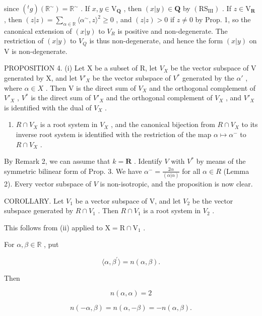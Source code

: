 since \((^t g)(\mathbb{R}^\sim) = \mathbb{R}^\sim\) . If \(x, y \in \mathrm{V}_{\mathbf{Q}}\) , then \((x|y) \in \mathbf{Q}\) by \((\mathrm{RS}_{\mathrm{III}})\) . If \(z \in \mathrm{V}_{\mathbf{R}}\) , then \((z|z) = \sum_{\alpha \in \mathbb{R}} \langle \alpha^\sim, z \rangle^2 \geqslant 0\) , and \((z|z) > 0\) if \(z \neq 0\) by Prop. 1, so the canonical extension of \((x|y)\) to \(V_{R}\) is positive and non-degenerate. The restriction of \((x|y)\) to \(V_{Q}\) is thus non-degenerate, and hence the form \((x|y)\) on V is non-degenerate.

PROPOSITION 4. (i) Let X be a subset of R, let \(V_{X}\) be the vector subspace of V generated by X, and let \(V'_{X}\) be the vector subspace of \(V^{*}\) generated by the \(\alpha'\) , where \(\alpha \in X\) . Then V is the direct sum of \(V_{X}\) and the orthogonal complement of \(V'_{X}\) , \(V^{*}\) is the direct sum of \(V'_{X}\) and the orthogonal complement of \(V_{X}\) , and \(V'_{X}\) is identified with the dual of \(V_{X}\) .

\begin{enumerate}
\def\labelenumi{(\roman{enumi})}
\setcounter{enumi}{1}
\tightlist
\item
  \(R \cap V_{X}\) is a root system in \(V_{X}\) , and the canonical bijection from \(R \cap V_{X}\) to its inverse root system is identified with the restriction of the map \(\alpha \mapsto \alpha^{-}\) to \(R \cap V_{X}\) .
\end{enumerate}

By Remark 2, we can assume that \(k = \mathbf{R}\) . Identify \(V\) with \(V^*\) by means of the symmetric bilinear form of Prop. 3. We have \(\alpha^{-} = \frac{2\alpha}{(\alpha|\alpha)}\) for all \(\alpha \in R\) (Lemma 2). Every vector subspace of \(V\) is non-isotropic, and the proposition is now clear.

COROLLARY. Let \(V_{1}\) be a vector subspace of V, and let \(V_{2}\) be the vector subspace generated by \(R \cap V_{1}\) . Then \(R \cap V_{1}\) is a root system in \(V_{2}\) .

This follows from (ii) applied to \(\mathrm{X} = \mathrm{R} \cap \mathrm{V}_1\) .

For \(\alpha, \beta \in \mathbb{R}\) , put

\[
\langle \alpha , \beta^ {\prime} \rangle = n (\alpha , \beta).\tag{1}
\]

Then

\[
n (\alpha , \alpha) = 2\tag{2}
\]

\[
n (- \alpha , \beta) = n (\alpha , - \beta) = - n (\alpha , \beta).\tag{3}
\]

